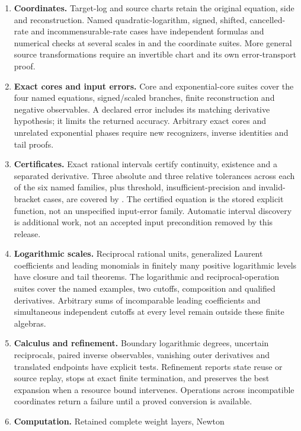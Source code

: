 \documentclass[11pt,a4paper]{article}
\begin{document}
\begin{enumerate}[leftmargin=1.8em]
\item \textbf{Coordinates.} Target-log and source charts retain the
original equation, side and reconstruction. Named quadratic-logarithm,
signed, shifted, cancelled-rate and incommensurable-rate cases have
independent formulas and numerical checks at several scales in
 and the coordinate suites.
More general source transformations require an invertible chart and its
own error-transport proof.
\item \textbf{Exact cores and input errors.} Core and exponential-core
suites cover the four named equations, signed/scaled branches, finite
reconstruction and negative observables. A declared error includes its
matching derivative hypothesis; it limits the returned accuracy.
Arbitrary exact cores and unrelated exponential phases require new
recognizers, inverse identities and tail proofs.
\item \textbf{Certificates.} Exact rational intervals certify continuity,
existence and a separated derivative. Three absolute and three relative
tolerances across each of the six named families, plus threshold,
insufficient-precision and invalid-bracket cases, are covered by
. The certified equation is the
stored explicit function, not an unspecified input-error family.
Automatic interval discovery is additional work, not an accepted input
precondition removed by this release.
\item \textbf{Logarithmic scales.} Reciprocal rational units, generalized
Laurent coefficients and leading monomials in finitely many positive
logarithmic levels have closure and tail theorems. The logarithmic and
reciprocal-operation suites cover the named examples, two cutoffs,
composition and qualified derivatives. Arbitrary sums of incomparable
leading coefficients and simultaneous independent cutoffs at every level
remain outside these finite algebras.
\item \textbf{Calculus and refinement.} Boundary logarithmic degrees,
uncertain reciprocals, paired inverse observables, vanishing outer
derivatives and translated endpoints have explicit tests. Refinement
reports state reuse or source replay, stops at exact finite termination,
and preserves the best expansion when a resource bound intervenes.
Operations across incompatible coordinates return a failure until a
proved conversion is available.
\item \textbf{Computation.} Retained complete weight layers, Newton

\end{enumerate}
\end{document}
